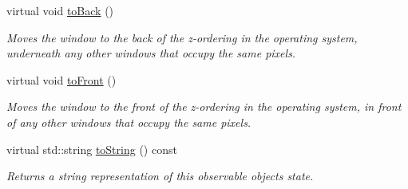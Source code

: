 \begin{DoxyCompactItemize}
virtual void \mbox{\hyperlink{classGWindow_a6053c984b166df7d3db5ee4c4ad65b99}{to\+Back}} ()
\begin{DoxyCompactList}\small\item\em Moves the window to the back of the z-\/ordering in the operating system, underneath any other windows that occupy the same pixels. \end{DoxyCompactList}\item 
virtual void \mbox{\hyperlink{classGWindow_a48a9c646659814220ac869bbcb60b52c}{to\+Front}} ()
\begin{DoxyCompactList}\small\item\em Moves the window to the front of the z-\/ordering in the operating system, in front of any other windows that occupy the same pixels. \end{DoxyCompactList}\item 
virtual std\+::string \mbox{\hyperlink{classGObservable_a1fe5121d6528fdea3f243321b3fa3a49}{to\+String}} () const
\begin{DoxyCompactList}\small\item\em Returns a string representation of this observable object\textquotesingle{}s state. \end{DoxyCompactList}\end{DoxyCompactItemize}

